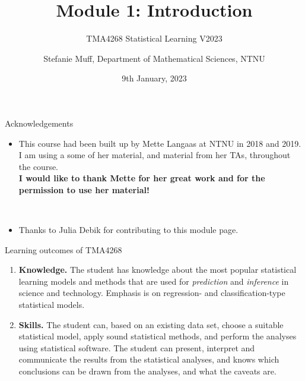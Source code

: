 \documentclass[
  10pt,
  ignorenonframetext,
]{beamer}
\title{Module 1: Introduction}
\subtitle{TMA4268 Statistical Learning V2023}
\author{Stefanie Muff, Department of Mathematical Sciences, NTNU}
\date{9th January, 2023}
\providecommand{\tightlist}{%
  \setlength{\itemsep}{0pt}\setlength{\parskip}{0pt}}
\begin{document}
\frame{\titlepage}

\begin{frame}{Acknowledgements}
\protect\hypertarget{acknowledgements}{}
\begin{itemize}
\tightlist
\item
  This course had been built up by Mette Langaas at NTNU in 2018 and
  2019. I am using a some of her material, and material from her TAs,
  throughout the course.\\
  \vspace{2mm} \textbf{I would like to thank Mette for her great work
  and for the permission to use her material!}
\end{itemize}

\(~\)

\begin{itemize}
\tightlist
\item
  Thanks to Julia Debik for contributing to this module page.
\end{itemize}
\end{frame}

\begin{frame}{Learning outcomes of TMA4268}
\protect\hypertarget{learning-outcomes-of-tma4268}{}
\begin{enumerate}
\item
  \textbf{Knowledge.} The student has knowledge about the most popular
  statistical learning models and methods that are used for
  \emph{prediction} and \emph{inference} in science and technology.
  Emphasis is on regression- and classification-type statistical models.
\item
  \textbf{Skills.} The student can, based on an existing data set,
  choose a suitable statistical model, apply sound statistical methods,
  and perform the analyses using statistical software. The student can
  present, interpret and communicate the results from the statistical
  analyses, and knows which conclusions can be drawn from the analyses,
  and what the caveats are.
\end{enumerate}
\end{frame}
\end{document}
